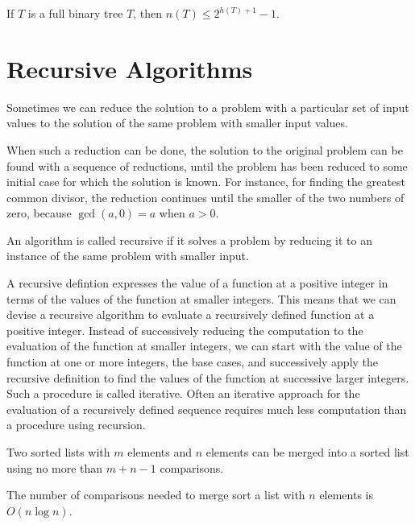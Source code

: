 \documentclass[../discrete.tex]{subfiles}
\begin{document}
\begin{theorem}
    If $T$ is a full binary tree $T$, then $n(T)\leq 2^{h(T)+1}-1$.
\end{theorem}

\section{Recursive Algorithms}
Sometimes we can reduce the solution to a problem with a particular set of input values 
to the solution of the same problem with smaller input values. 

When such a reduction can be done, the solution to the original problem can be found 
with a sequence of reductions, until the problem has been reduced to some initial case for 
which the solution is known. For instance, for finding the greatest common divisor, the reduction continues 
until the smaller of the two numbers of zero, because $\gcd (a,0) = a$ when $a>0$.

\begin{definition}
    An algorithm is called recursive if it solves a problem by reducing it to 
    an instance of the same problem with smaller input.
\end{definition}

A recursive defintion expresses the value of a function at a positive integer in 
terms of the values of the function at smaller integers. This means that we can devise
a recursive algorithm to evaluate a recursively defined function at a positive integer.
Instead of successively reducing the computation to the evaluation of the function 
at smaller integers, we can start with the value of the function at one or more integers, the base cases,
and successively apply the recursive definition to find the values of the function at 
successive larger integers. Such a procedure is called iterative. Often an iterative approach 
for the evaluation of a recursively defined sequence requires much less computation than a 
procedure using recursion.

\begin{lemma}
    Two sorted lists with $m$ elements and $n$ elements can be merged into a sorted list 
    using no more than $m+n-1$ comparisons.
\end{lemma}

\begin{theorem}
    The number of comparisons needed to merge sort a list with $n$ elements is $O(n \log n)$.
\end{theorem}
\end{document}
